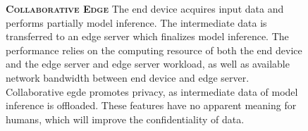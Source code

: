 \begin{figure}
	\begin{minipage}{0.65\linewidth}
		\textbf{\protect{} \textsc{Collaborative Edge}}
		\color{caption-color} \newline
		The end device acquires input data and performs partially model inference. The intermediate data is transferred to an edge server which finalizes model inference. The performance relies on the computing resource of both the end device and the edge server and edge server workload, as well as available network bandwidth between end device and edge server. Collaborative egde promotes privacy, as intermediate data of model inference is offloaded. These features have no apparent meaning for humans, which will improve the confidentiality of data.   
	\end{minipage}%
	\hfill
	\begin{minipage}{0.3\linewidth}
		\centering
		\captionsetup[subfigure]{justification=centering}
		\begin{figure}
			\centering

\end{figure}
\end{minipage}
\end{figure}
